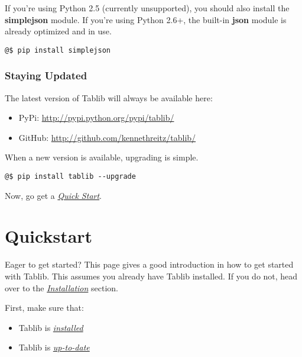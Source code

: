 \documentclass[a4paper,12pt,english]{sphinxmanual}
\begin{document}
If you're using Python 2.5 (currently unsupported), you should also install the \textbf{simplejson} module. If you're using Python 2.6+, the built-in \textbf{json} module is already optimized and in use.

\begin{Verbatim}[commandchars=@\[\]]
@$ pip install simplejson
\end{Verbatim}


\subsection{Staying Updated}
\label{install:staying-updated}\label{install:updates}
The latest version of Tablib will always be available here:
\begin{itemize}
\item {} 
PyPi: \href{http://pypi.python.org/pypi/tablib/}{http://pypi.python.org/pypi/tablib/}

\item {} 
GitHub: \href{http://github.com/kennethreitz/tablib/}{http://github.com/kennethreitz/tablib/}

\end{itemize}

When a new version is available, upgrading is simple.

\begin{Verbatim}[commandchars=@\[\]]
@$ pip install tablib --upgrade
\end{Verbatim}

Now, go get a {\hyperref[tutorial:quickstart]{\emph{Quick Start}}}.


\chapter{Quickstart}
\label{tutorial::doc}\label{tutorial:quickstart}\label{tutorial:id1}\label{tutorial:module-tablib}
Eager to get started? This page gives a good introduction in how to get started with Tablib. This assumes you already have Tablib installed. If you do not, head over to the {\hyperref[install:install]{\emph{Installation}}} section.

First, make sure that:
\begin{itemize}
\item {} 
Tablib is {\hyperref[install:install]{\emph{installed}}}

\item {} 
Tablib is {\hyperref[install:updates]{\emph{up-to-date}}}

\end{itemize}
\end{document}

